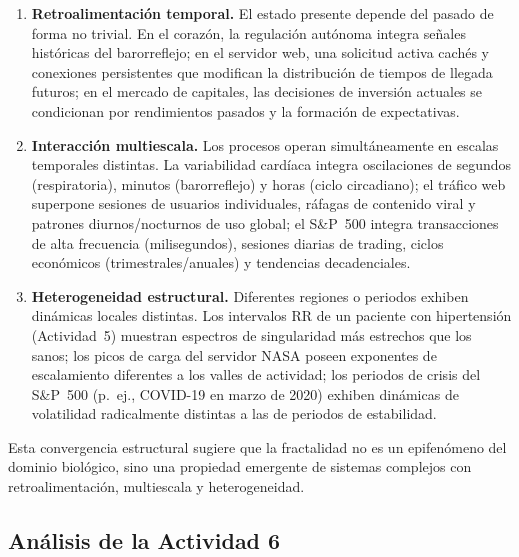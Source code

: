\begin{enumerate}[leftmargin=2em]
    \item \textbf{Retroalimentación temporal.} El estado presente depende del
          pasado de forma no trivial. En el corazón, la regulación autónoma
          integra señales históricas del barorreflejo; en el servidor web, una
          solicitud activa cachés y conexiones persistentes que modifican la
          distribución de tiempos de llegada futuros; en el mercado de capitales,
          las decisiones de inversión actuales se condicionan por rendimientos pasados
          y la formación de expectativas.
    \item \textbf{Interacción multiescala.} Los procesos operan simultáneamente
          en escalas temporales distintas. La variabilidad cardíaca integra
          oscilaciones de segundos (respiratoria), minutos (barorreflejo) y
          horas (ciclo circadiano); el tráfico web superpone sesiones de
          usuarios individuales, ráfagas de contenido viral y patrones
          diurnos/nocturnos de uso global; el S\&P~500 integra transacciones
          de alta frecuencia (milisegundos), sesiones diarias de trading,
          ciclos económicos (trimestrales/anuales) y tendencias decadenciales.
    \item \textbf{Heterogeneidad estructural.} Diferentes regiones o periodos
          exhiben dinámicas locales distintas. Los intervalos RR de un paciente
          con hipertensión (Actividad~5) muestran espectros de singularidad más
          estrechos que los sanos; los picos de carga del servidor NASA poseen
          exponentes de escalamiento diferentes a los valles de actividad;
          los periodos de crisis del S\&P~500 (p.~ej., COVID-19 en marzo de 2020)
          exhiben dinámicas de volatilidad radicalmente distintas a las de periodos
          de estabilidad.
\end{enumerate}

Esta convergencia estructural sugiere que la fractalidad no es un epifenómeno
 del dominio biológico, sino una propiedad emergente de sistemas complejos con
retroalimentación, multiescala y heterogeneidad.

\subsection{Análisis de la Actividad 6}


